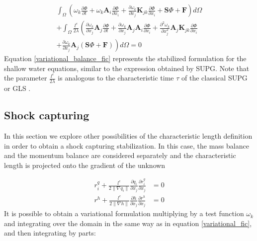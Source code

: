 \documentclass[a4paper,12pt]{article}
\newcommand{\pder}[2]{\frac{\partial#1}{\partial#2}}
\newcommand{\ppder}[2]{\frac{\partial^2#1}{\partial#2^2}}
\newcommand{\norm}[1]{\lVert#1\rVert}
\begin{document}
\begin{multline} \label{variational_balance_fic}
\int_\Omega \left(
    \omega_k \pder{\Phi}{t} + \omega_k \mathbf{A}_i\pder{\Phi}{x_i}
    + \pder{\omega_k}{x_j} \mathbf{K}_{jk} \pder{\Phi}{x_i} + \mathbf{S}\Phi + \mathbf{F}
\right) d\Omega\\ +
\int_\Omega \frac{l^e}{2\lambda} \left(
    \pder{\omega_k}{x_j} \mathbf{A}_j \pder{\Phi}{t}
    + \pder{\omega_k}{x_j} \mathbf{A}_j\mathbf{A}_i\pder{\Phi}{x_i}
    + \ppder{\omega_k}{x_j} \mathbf{A}_j\mathbf{K}_{jk} \pder{\Phi}{x_i} \right. \\
    \left.
    + \pder{\omega_k}{x_j} \mathbf{A}_j(\mathbf{S}\Phi + \mathbf{F})
\right) d\Omega
=0
\end{multline}
Equation \ref{variational_balance_fic} represents the stabilized formulation for the shallow water equations, similar to the expression obtained by SUPG. Note that the parameter $\frac{l^e}{2\lambda}$ is analogous to the characteristic time $\tau$ of the classical SUPG or GLS \cite{cotela2016}.


\subsection{Shock capturing}

In this section we explore other possibilities of the characteristic length definition in order to obtain a shock capturing stabilization. In this case, the mass balance and the momentum balance are considered separately and the characteristic length is projected onto the gradient of the unknown

\begin{subequations}
\begin{align}
r_i^q + \frac{l^e}{2\norm{\nabla q_i}}\pder{q_i}{x_j}\pder{r_i^q}{x_j} &= 0 \\
r^h + \frac{l^e}{2\norm{\nabla h}} \pder{h}{x_j} \pder{r^h}{x_j} &=0
\end{align}
\end{subequations}
It is possible to obtain a variational formulation multiplying by a test function $\omega_k$ and integrating over the domain in the same way as in equation \ref{variational_fic}, and then integrating by parts:
\end{document}
